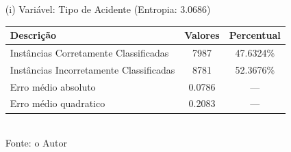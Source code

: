 \begin{enumerate}
	\item[(i)] Variável: Tipo de Acidente (Entropia: 3.0686)
		\begin{table}[!ht]
			\centering
			\vspace{1mm}
			\begin{tabular}{l|c|c}
				\hline
				\textbf{Descrição} & \textbf{Valores} & \textbf{Percentual} \\
				\hline
				Instâncias Corretamente Classificadas & 7987 & 47.6324\% \\
				Instâncias Incorretamente Classificadas & 8781 & 52.3676\% \\
				Erro médio absoluto & 0.0786 & ---  \\
				Erro médio quadratico & 0.2083 & --- \\
			\end{tabular}
			\\
			\tiny Fonte: o Autor
		\end{table}
		
		\pagebreak
		

\end{enumerate}
